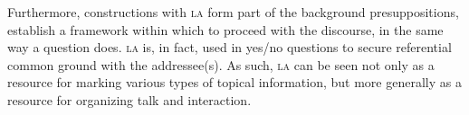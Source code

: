 Furthermore, constructions with \textsc{la} form part of the background presuppositions, establish a framework within which to proceed with the discourse, in the same way a question does. \textsc{la} is, in fact, used in yes/no questions to secure referential common ground with the addressee(s). As such, \textsc{la} can be seen not only as a resource for marking various types of topical information, but more generally as a resource for organizing talk and interaction. 


